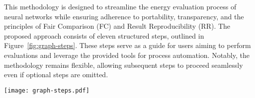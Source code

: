
This methodology is designed to streamline the energy evaluation process of neural networks while ensuring adherence to portability, transparency, and the principles of Fair Comparison (FC) and Result Reproducibility (RR). The proposed approach consists of eleven structured steps, outlined in Figure~\ref{fig:graph-steps}. These steps serve as a guide for users aiming to perform evaluations and leverage the provided tools for process automation. Notably, the methodology remains flexible, allowing subsequent steps to proceed seamlessly even if optional steps are omitted.

\begin{figure*}[th!]
\centering
\caption{Steps of the proposed methodology for energy evaluation, covering all phases from setup to energy calculation.}
\texttt{[image: graph-steps.pdf]}
\label{fig:graph-steps}
\end{figure*}


